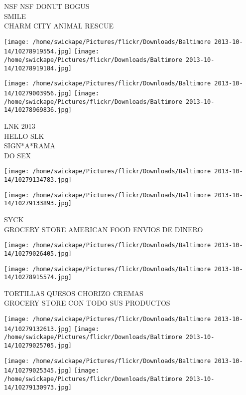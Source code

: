 \documentclass[10pt,letterpaper]{article}
\begin{document}
NSF NSF DONUT BOGUS\\
SMILE\\
CHARM CITY ANIMAL RESCUE\\
\pagebreak

\texttt{[image: /home/swickape/Pictures/flickr/Downloads/Baltimore 2013-10-14/10278919554.jpg]}
\texttt{[image: /home/swickape/Pictures/flickr/Downloads/Baltimore 2013-10-14/10278919184.jpg]}

\texttt{[image: /home/swickape/Pictures/flickr/Downloads/Baltimore 2013-10-14/10279003956.jpg]}
\texttt{[image: /home/swickape/Pictures/flickr/Downloads/Baltimore 2013-10-14/10278969836.jpg]}

LNK 2013\\
HELLO SLK\\
SIGN*A*RAMA\\
DO SEX\\
\pagebreak

\texttt{[image: /home/swickape/Pictures/flickr/Downloads/Baltimore 2013-10-14/10279134783.jpg]}

\vspace{0.25in}
\texttt{[image: /home/swickape/Pictures/flickr/Downloads/Baltimore 2013-10-14/10279133893.jpg]}

SYCK\\
GROCERY STORE AMERICAN FOOD ENVIOS DE DINERO\\
\pagebreak

\texttt{[image: /home/swickape/Pictures/flickr/Downloads/Baltimore 2013-10-14/10279026405.jpg]}

\vspace{0.25in}
\texttt{[image: /home/swickape/Pictures/flickr/Downloads/Baltimore 2013-10-14/10278915574.jpg]}

TORTILLAS QUESOS CHORIZO CREMAS\\
GROCERY STORE CON TODO SUS PRODUCTOS\\
\pagebreak

\texttt{[image: /home/swickape/Pictures/flickr/Downloads/Baltimore 2013-10-14/10279132613.jpg]}
\texttt{[image: /home/swickape/Pictures/flickr/Downloads/Baltimore 2013-10-14/10279025705.jpg]}

\texttt{[image: /home/swickape/Pictures/flickr/Downloads/Baltimore 2013-10-14/10279025345.jpg]}
\texttt{[image: /home/swickape/Pictures/flickr/Downloads/Baltimore 2013-10-14/10279130973.jpg]}
\end{document}
